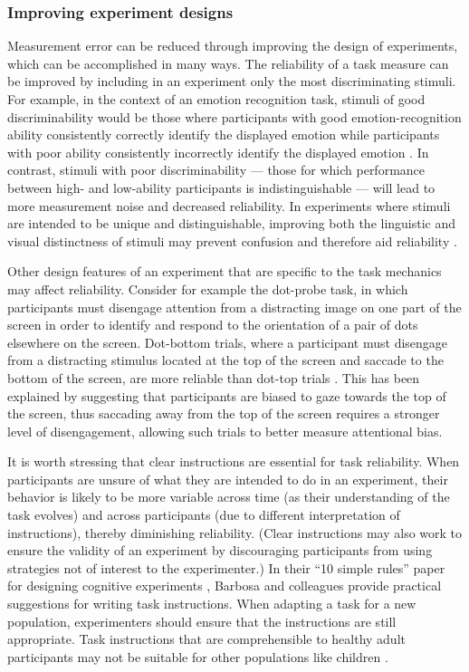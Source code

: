 \documentclass[a4paper,notitlepage,12pt]{article}
\begin{document}
\subsubsection{Improving experiment designs}

Measurement error can be reduced through improving the design of experiments, which can be accomplished in many ways. The reliability of a task measure can be improved by including in an experiment only the most discriminating stimuli. For example, in the context of an emotion recognition task, stimuli of good discriminability would be those where participants with good emotion-recognition ability consistently correctly identify the displayed emotion while participants with poor ability consistently incorrectly identify the displayed emotion \cite{keutmann2015generating}. In contrast, stimuli with poor discriminability --- those for which performance between high- and low-ability participants is indistinguishable --- will lead to more measurement noise and decreased reliability. In experiments where stimuli are intended to be unique and distinguishable, improving both the linguistic and visual distinctness of stimuli may prevent confusion and therefore aid reliability \cite{yoo2022importance}.  

Other design features of an experiment that are specific to the task mechanics may affect reliability. Consider for example the dot-probe task, in which participants must disengage attention from a distracting image on one part of the screen in order to identify and respond to the orientation of a pair of dots elsewhere on the screen. Dot-bottom trials, where a participant must disengage from a distracting stimulus located at the top of the screen and saccade to the bottom of the screen, are more reliable than dot-top trials \cite{price2015empirical, aday2019extended}. This has been explained by suggesting that participants are biased to gaze towards the top of the screen, thus saccading away from the top of the screen requires a stronger level of disengagement, allowing such trials to better measure attentional bias. 

It is worth stressing that clear instructions are essential for task reliability. When participants are unsure of what they are intended to do in an experiment, their behavior is likely to be more variable across time (as their understanding of the task evolves) and across participants (due to different interpretation of instructions), thereby diminishing reliability. (Clear instructions may also work to ensure the validity of an experiment by discouraging participants from using strategies not of interest to the experimenter.) In their ``10 simple rules'' paper for designing cognitive experiments \cite{barbosa2022practical}, Barbosa and colleagues provide practical suggestions for writing task instructions. When adapting a task for a new population, experimenters should ensure that the instructions are still appropriate. Task instructions that are comprehensible to healthy adult participants may not be suitable for other populations like children \cite{hughes2002measuring}. 
\end{document}
